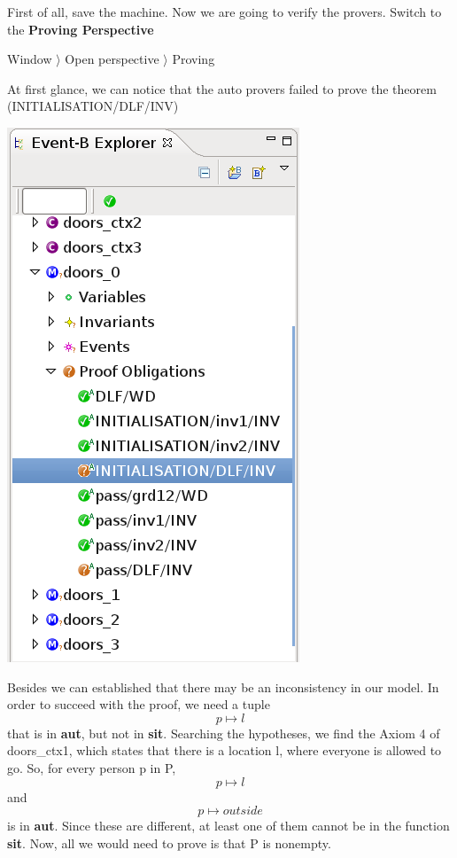 First of all, save the machine. Now we are going to verify the provers. 
Switch to the \textbf{Proving Perspective}

\textsf{ Window $\rangle$ Open perspective $\rangle$ Proving }

At first glance, we can notice that the auto provers failed to prove the theorem (\textsf{INITIALISATION/DLF/INV})
\begin{center}
	\includegraphics[]{img/tutorial/tut_10_proversfailed.png}
\end{center}

Besides we can established that there may be an inconsistency in our model.
In order to succeed with the proof, we need a tuple \[ p \mapsto l \]that is in \textbf{aut}, but not in \textbf{sit}. Searching the hypotheses, we find the Axiom 4 of doors\_ctx1, which states that there is a location l, where everyone is allowed to go. So, for every person p in P, \[p \mapsto l \] and \[p \mapsto outside\] is in \textbf{aut}. Since these are different, at least one of them cannot be in the function \textbf{sit}. Now, all we would need to prove is that P is nonempty. 

